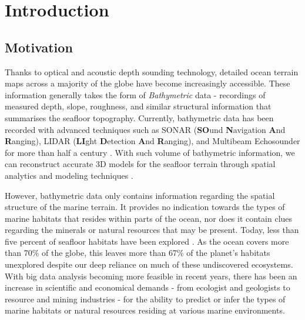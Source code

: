 \chapter{Introduction}
\label{Introduction}

	\section{Motivation}
	
		Thanks to optical and acoustic depth sounding technology, detailed ocean terrain maps across a majority of the globe have become increasingly accessible. These information generally takes the form of \textit{Bathymetric} data - recordings of measured depth, slope, roughness, and similar structural information that summarises the seafloor topography. Currently, bathymetric data has been recorded with advanced techniques such as SONAR (\textbf{SO}und \textbf{N}avigation \textbf{A}nd \textbf{R}anging), LIDAR (\textbf{LI}ght \textbf{D}etection \textbf{A}nd \textbf{R}anging), and Multibeam Echosounder for more than half a century \citep{Niedzielski2013231, Colbo201441}. With such volume of bathymetric information, we can reconstruct accurate 3D models for the seafloor terrain through spatial analytics and modeling techniques \citep{Niedzielski2013231}.
		
		However, bathymetric data only contains information regarding the spatial structure of the marine terrain. It provides no indication towards the types of marine habitats that resides within parts of the ocean, nor does it contain clues regarding the minerals or natural resources that may be present. Today, less than five percent of seafloor habitats have been explored \citep{NOAA}. As the ocean covers more than 70\% of the globe, this leaves more than 67\% of the planet's habitats unexplored despite our deep reliance on much of these undiscovered ecosystems. With big data analysis becoming more feasible in recent years, there has been an increase in scientific and economical demands - from ecologist and geologists to resource and mining industries - for the ability to predict or infer the types of marine habitats or natural resources residing at various marine environments.
		
